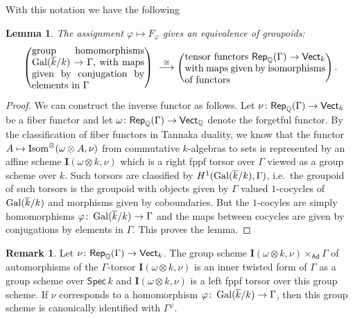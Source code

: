 \documentclass[twoside,leqno]{article}
\numberwithin{equation}{section}
\theoremstyle{plain}
\newtheorem{lemma}[equation]{Lemma}
\theoremstyle{definition}
\newtheorem{remark}[equation]{Remark}
\begin{document}
\medskip
With this notation we have the following

\begin{lemma} \label{lem:nuVect}
The assignment $\varphi \mapsto
F_{\varphi}$ gives an equivalence of groupoids:
\[
\left(\text{\begin{minipage}[c]{1.6in}
group homomorphisms $\Gal(\kbar/k) \to \Gamma$, with maps given 
by conjugation by elements in $\Gamma$
\end{minipage}}\right)
\
\stackrel{\cong}{\longrightarrow}
\left(\text{\begin{minipage}[c]{2in}tensor
  functors $\mathsf{Rep}_{\bbQ}(\Gamma) \to \mathsf{Vect}_{k}$
  with maps given by isomorphisms of functors\end{minipage}}\right).
\]
\end{lemma}
\begin{proof} We can construct the inverse functor as follows.
 Let $\nu \colon \mathsf{Rep}_{\mathbb Q}(\Gamma) \to
\mathsf{Vect}_{k}$ be a fiber functor and let $\omega \colon
\mathsf{Rep}_{\mathbb Q}(\Gamma) \to \mathsf{Vect}_{\mathbb Q}$ denote the
forgetful functor.  By the classification
\cite[Theorem~II.8.1]{milne-tannakian} of fiber functors in Tannaka
duality, we know that the functor $A \mapsto
\operatorname{Isom}^{\otimes}(\omega\otimes A,\nu)$ from commutative
$k$-algebras to sets is represented by an affine scheme
$\mathbf{I}(\omega\otimes k,\nu)$ which is a right fppf torsor over
$\Gamma$ viewed as a group scheme over $k$. Such torsors are
classified by $H^{1}(\operatorname{Gal}(\overline{k}/k),\Gamma)$, i.e.\ the groupoid of such
torsors is the groupoid with objects given by $\Gamma$ valued
$1$-cocycles of $\operatorname{Gal}(\overline{k}/k)$ and morphisms given by
coboundaries. But the $1$-cocyles are simply homomorphisms $\varphi \colon
\operatorname{Gal}(\overline{k}/k) \to \Gamma$ and the maps between cocycles are given by
conjugations by elements in $\Gamma$. This proves the lemma.  
\end{proof}

\begin{remark} \label{rem:leftact} 
Let $\nu \colon
\mathsf{Rep}_{\mathbb Q}(\Gamma) \to \mathsf{Vect}_{k}$. The group scheme
$\mathbf{I}(\omega\otimes k,\nu)\times_{\mathsf{Ad}} \Gamma$ of
automorphisms of the $\Gamma$-torsor $\mathbf{I}(\omega\otimes k,\nu)$
is an inner twisted form of $\Gamma$ as a group scheme over
$\mathsf{Spec}\, k$ and $\mathbf{I}(\omega\otimes k,\nu)$ is a left
fppf torsor over this group scheme. If $\nu$ corresponds to a
homomorphism $\varphi \colon \operatorname{Gal}(\overline{k}/k) \to \Gamma$, then this group
scheme is canonically identified with $\Gamma^{\varphi}$.
\end{remark}
\end{document}
